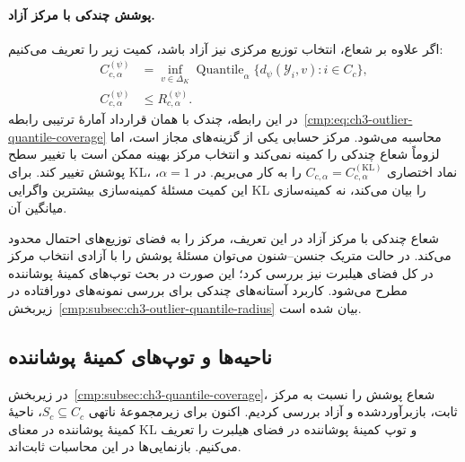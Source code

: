 \paragraph{پوشش چندکی با مرکز آزاد.}
اگر علاوه بر شعاع، انتخاب توزیع مرکزی نیز آزاد
باشد، کمیت زیر را تعریف می‌کنیم:
\begin{equation}\label{cmp:eq:ch3-outlier-optimized-quantile}
\begin{aligned}
C_{c,\alpha}^{(\psi)}
&=\inf_{v\in\Delta_K}
\operatorname{Quantile}_{\alpha}
\{d_\psi(\mathscr Y_i,v):i\in C_c\},\\
C_{c,\alpha}^{(\psi)}&\le R_{c,\alpha}^{(\psi)}.
\end{aligned}
\end{equation}
در این رابطه، چندک با همان قرارداد آمارهٔ ترتیبی
رابطه~\eqref{cmp:eq:ch3-outlier-quantile-coverage}
محاسبه می‌شود. مرکز حسابی یکی از گزینه‌های مجاز است،
اما لزوماً شعاع چندکی را کمینه نمی‌کند و انتخاب
مرکز بهینه ممکن است با تغییر سطح پوشش تغییر کند.
برای KL، نماد اختصاری
$C_{c,\alpha}=C_{c,\alpha}^{(\mathrm{KL})}$ را
به کار می‌بریم. در $\alpha=1$، این کمیت مسئلهٔ
کمینه‌سازی بیشترین واگرایی KL را بیان می‌کند،
نه کمینه‌سازی میانگین آن.

شعاع چندکی با مرکز آزاد در این تعریف، مرکز را
به فضای توزیع‌های احتمال محدود می‌کند. در حالت
متریک جنسن--شنون می‌توان مسئلهٔ پوشش را با آزادی
انتخاب مرکز در کل فضای هیلبرت نیز بررسی کرد؛
این صورت در بحث توپ‌های کمینهٔ پوشاننده مطرح
می‌شود. کاربرد آستانه‌های چندکی برای بررسی
نمونه‌های دورافتاده در
زیربخش~\ref{cmp:subsec:ch3-outlier-quantile-radius}
بیان شده است.

\subsection{ناحیه‌ها و توپ‌های کمینهٔ پوشاننده}
\label{cmp:subsec:ch3-minimum-enclosing-ball}

در زیربخش~\ref{cmp:subsec:ch3-quantile-coverage}،
شعاع پوشش را نسبت به مرکز ثابت، بازبرآوردشده و
آزاد بررسی کردیم. اکنون برای زیرمجموعهٔ ناتهی
$S_c\subseteq C_c$، ناحیهٔ کمینهٔ پوشاننده در معنای
KL و توپ کمینهٔ پوشاننده در فضای هیلبرت را تعریف
می‌کنیم. بازنمایی‌ها در این محاسبات ثابت‌اند.

